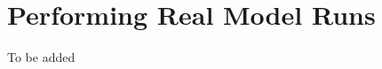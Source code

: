 \documentclass[main.tex]{subfiles}
\begin{document}
\setcounter{section}{3}
\section{Performing Real Model Runs}\label{sec:realmodel}

To be added
\end{document}
